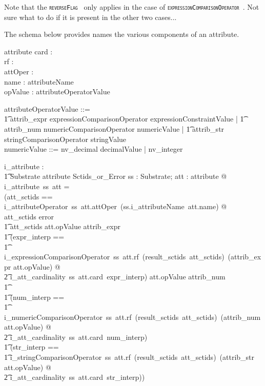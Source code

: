 \documentclass{article}
\def\spec#1{{\tt \small \textsc{{#1}} }}
\begin{document}
Note that the \spec{reverseFlag} only applies in the case of \spec{expressionComparisonOperator}.  Not sure what to do if it is present in the other two cases...

The schema below provides names the various components of an attribute.
\begin{schema}{attribute}
   card : \optional[cardinality] \\
   rf : \optional[reverseFlag] \\
   attOper : \optional[constraintOperator] \\
   name : attributeName \\
   opValue : attributeOperatorValue
\end{schema}

\begin{zed}
attributeOperatorValue ::= \\
\t1 attrib\_expr \ldata expressionComparisonOperator \cross expressionConstraintValue \rdata |
\also
\t1 attrib\_num \ldata numericComparisonOperator \cross numericValue \rdata | 
\also
\t1 attrib\_str \ldata stringComparisonOperator \cross stringValue \rdata \\
\also
numericValue ::= nv\_decimal \ldata decimalValue \rdata |  nv\_integer \ldata \nat \rdata 
\also
[reverseFlag] 
\end{zed}

\begin{gendef}
   i\_attribute : \\
\t1 Substrate  \fun attribute \fun Sctids\_or\_Error
\where
   \forall ss : Substrate; att : attribute @ \\
   i\_attribute~ss~att = \\
   (\LET att\_sctids == i\_attributeOperator~ss~att.attOper~(ss.i\_attributeName~att.name) @ \\
   \IF att\_sctids \in \ran error \THEN \\
   \t1 att\_sctids
\also
   \ELSE \IF att.opValue \in \ran attrib\_expr \THEN \\
\t1 (\LET expr\_interp == \\
\t1 i\_expressionComparisonOperator~ss~att.rf~(result\_sctids~att\_sctids)~(attrib\_expr \inv att.opValue)  @ \\
\t2 i\_att\_cardinality~ss~att.card~expr\_interp)
\also
   \ELSE \IF att.opValue \in \ran attrib\_num \\
\t1 \THEN \\
\t1 (\LET num\_interp == \\
\t1 i\_numericComparisonOperator~ss~att.rf~(result\_sctids~att\_sctids)~(attrib\_num \inv att.opValue)  @ \\
\t2 i\_att\_cardinality~ss~att.card~num\_interp)
\also
   \ELSE  \\
\t1 (\LET str\_interp == \\
\t1 i\_stringComparisonOperator~ss~att.rf~(result\_sctids~att\_sctids)~(attrib\_str \inv att.opValue)  @ \\
\t2 i\_att\_cardinality~ss~att.card~str\_interp))
\end{gendef}
\end{document}
